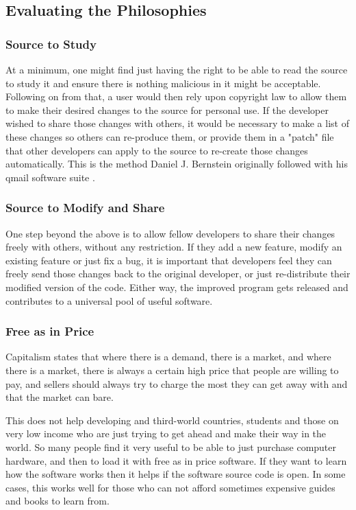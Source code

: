 \subsection{Evaluating the Philosophies}
\subsubsection{Source to Study}
At a minimum, one might find just having the right to be able to read the source to study it and ensure there is nothing malicious in it might be acceptable. Following on from that, a user would then rely upon copyright law to allow them to make their desired changes to the source for personal use. If the developer wished to share those changes with others, it would be necessary to make a list of these changes so others can re-produce them, or provide them in a "patch" file that other developers can apply to the source to re-create those changes automatically. This is the method Daniel J. Bernstein originally followed with his qmail software suite \cite{djb}.

\subsubsection{Source to Modify and Share}
One step beyond the above is to allow fellow developers to share their changes freely with others, without any restriction. If they add a new feature, modify an existing feature or just fix a bug, it is important that developers feel they can freely send those changes back to the original developer, or just re-distribute their modified version of the code. Either way, the improved program gets released and contributes to a universal pool of useful software.

\subsubsection{Free as in Price}
Capitalism states\cite{supplydemand} that where there is a demand, there is a market, and where there is a market, there is always a certain high price that people are willing to pay, and sellers should always try to charge the most they can get away with and that the market can bare.

This does not help developing and third-world countries, students and those on very low income who are just trying to get ahead and make their way in the world. So many people find it very useful to be able to just purchase computer hardware, and then to load it with free as in price software. If they want to learn how the software works then it helps if the software source code is open. In some cases, this works well for those who can not afford sometimes expensive guides and books to learn from.

